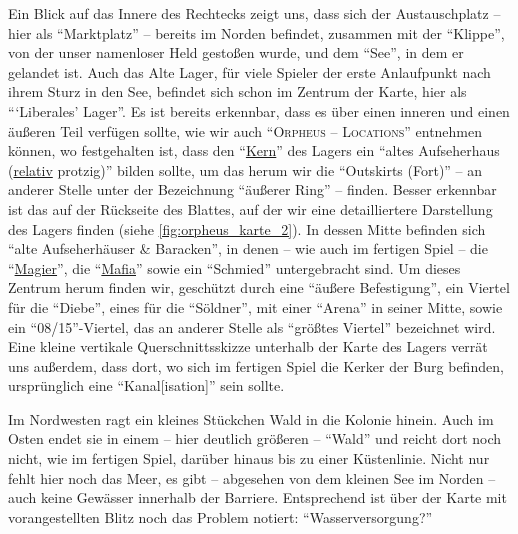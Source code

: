 \documentclass[a5paper,pagesize,numbers=noenddot]{scrbook}
\begin{document}
Ein Blick auf das Innere des Rechtecks zeigt uns, dass sich der Austauschplatz -- hier als \enquote{Marktplatz} -- bereits im Norden befindet, zusammen mit der \enquote{Klippe}, von der unser namenloser Held gestoßen wurde, und dem \enquote{See}, in dem er gelandet ist.
Auch das Alte Lager, für viele Spieler der erste Anlaufpunkt nach ihrem Sturz in den See, befindet sich schon im Zentrum der Karte, hier als \enquote{\enquote{Liberales} Lager}. %
Es ist bereits erkennbar, dass es über einen inneren und einen äußeren Teil verfügen sollte, wie wir auch \enquote{\textsc{Orpheus -- Locations}} entnehmen können, wo festgehalten ist, dass den \enquote{\uline{Kern}} des Lagers ein \enquote{altes Aufseherhaus (\uline{relativ} protzig)} bilden sollte, um das herum wir die \enquote{Outskirts (Fort)}\autocite[S.~5]{orpheus_b_scribbles} -- an anderer Stelle unter der Bezeichnung \enquote{äußerer Ring}\autocite[S.~19]{orpheus_b_scribbles} -- finden.
Besser erkennbar ist das auf der Rückseite des Blattes, auf der wir eine detailliertere Darstellung des Lagers finden (siehe \autoref{fig:orpheus_karte_2}).
In dessen Mitte befinden sich \enquote{alte Aufseherhäuser \& Baracken}, in denen -- wie auch im fertigen Spiel -- die \enquote{\uline{Magier}}, die \enquote{\uline{Mafia}} sowie ein \enquote{Schmied} untergebracht sind.
Um dieses Zentrum herum finden wir, geschützt durch eine \enquote{äußere Befestigung}, ein Viertel für die \enquote{Diebe}, eines für die \enquote{Söldner}, mit einer \enquote{Arena} in seiner Mitte, sowie ein \enquote{08/15}-Viertel,\autocite[S.~12]{orpheus_b_scribbles} das an anderer Stelle als \enquote{größtes Viertel}\autocite[S.~14]{orpheus_b_scribbles} bezeichnet wird.
Eine kleine vertikale Querschnittsskizze unterhalb der Karte des Lagers verrät uns außerdem, dass dort, wo sich im fertigen Spiel die Kerker der Burg befinden, ursprünglich eine \enquote{Kanal[isation]} sein sollte.\autocite[S.~12]{orpheus_b_scribbles}

Im Nordwesten ragt ein kleines Stückchen Wald in die Kolonie hinein.
Auch im Osten endet sie in einem -- hier deutlich größeren -- \enquote{Wald} und reicht dort noch nicht, wie im fertigen Spiel, darüber hinaus bis zu einer Küstenlinie.
Nicht nur fehlt hier noch das Meer, es gibt -- abgesehen von dem kleinen See im Norden -- auch keine Gewässer innerhalb der Barriere.
Entsprechend ist über der Karte mit vorangestellten Blitz noch das Problem notiert:
\enquote{Wasserversorgung?}\autocite[S.~11]{orpheus_b_scribbles}
\end{document}
